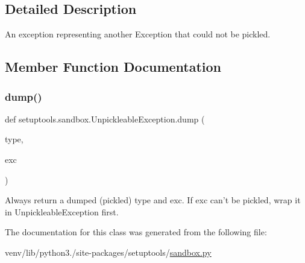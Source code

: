 \subsection{Detailed Description}
\begin{DoxyVerb}An exception representing another Exception that could not be pickled.
\end{DoxyVerb}
 

\subsection{Member Function Documentation}
\mbox{\label{classsetuptools_1_1sandbox_1_1UnpickleableException_af422ad487e1865fe760f193c6e63960c}} 
\subsubsection{\texorpdfstring{dump()}{dump()}}
{\footnotesize\ttfamily def setuptools.\+sandbox.\+Unpickleable\+Exception.\+dump (\begin{DoxyParamCaption}\item[{}]{type,  }\item[{}]{exc }\end{DoxyParamCaption})\hspace{0.3cm}{\ttfamily [static]}}

\begin{DoxyVerb}Always return a dumped (pickled) type and exc. If exc can't be pickled,
wrap it in UnpickleableException first.
\end{DoxyVerb}
 

The documentation for this class was generated from the following file\+:\begin{DoxyCompactItemize}
\item 
venv/lib/python3./site-\/packages/setuptools/\hyperlink{sandbox_8py}{sandbox.\+py}\end{DoxyCompactItemize}
